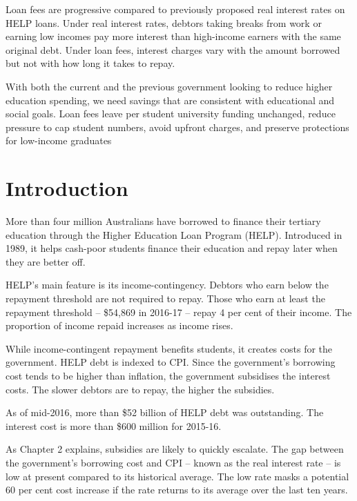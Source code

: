 \documentclass[embargoed]{grattan}
\begin{document}
\begin{overview}
Loan fees are progressive compared to previously proposed real interest rates on HELP loans. Under real interest rates, debtors taking breaks from work or earning low incomes pay more interest than high-income earners with the same original debt. Under loan fees, interest charges vary with the amount borrowed but not with how long it takes to repay.

With both the current and the previous government looking to reduce higher education spending, we need savings that are consistent with educational and social goals. Loan fees leave per student university funding unchanged, reduce pressure to cap student numbers, avoid upfront charges, and preserve protections for low-income graduates
\end{overview}

\contentspage



\chapter{{Introduction}}\label{introduction}

More than four million Australians have borrowed to finance their tertiary education through the Higher Education Loan Program (HELP). Introduced in 1989, it helps cash-poor students finance their education and repay later when they are better off.

HELP's main feature is its income-contingency. Debtors who earn below the repayment threshold are not required to repay. Those who earn at least the repayment threshold -- \$54,869 in 2016-17 -- repay 4 per cent of their income. The proportion of income repaid increases as income rises.

While income-contingent repayment benefits students, it creates costs for the government. HELP debt is indexed to CPI. Since the government's borrowing cost tends to be higher than inflation, the government subsidises the interest costs. The slower debtors are to repay, the higher the subsidies.

As of mid-2016, more than \$52 billion of HELP debt was outstanding. The interest cost is more than \$600 million for 2015-16.

As Chapter 2 explains, subsidies are likely to quickly escalate. The gap between the government's borrowing cost and CPI -- known as the real interest rate -- is low at present compared to its historical average. The low rate masks a potential 60 per cent cost increase if the rate returns to its average over the last ten years.
\end{document}
